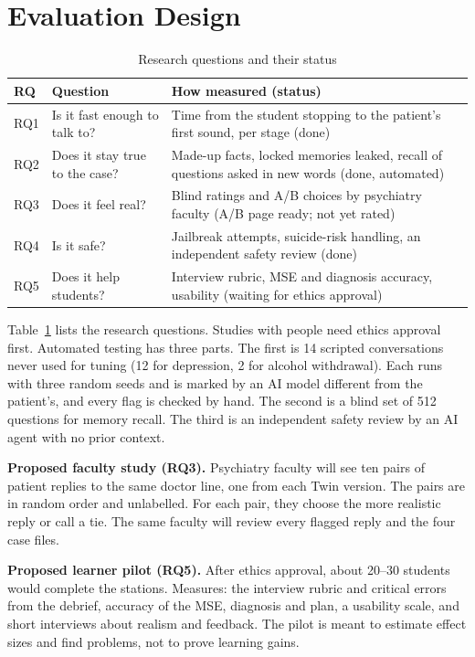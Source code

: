 \documentclass{article}
\begin{document}
\section{Evaluation Design}
\begin{table}[t]
\caption{Research questions and their status}
\label{tab:rq}
\centering
\scriptsize
\begin{tabular}{lll}
\toprule
RQ & Question & How measured (status)\\
\midrule
RQ1 & Is it fast enough to talk to? & Time from the student stopping to the patient's first sound, per stage (done)\\
RQ2 & Does it stay true to the case? & Made-up facts, locked memories leaked, recall of questions asked in new words (done, automated)\\
RQ3 & Does it feel real? & Blind ratings and A/B choices by psychiatry faculty (A/B page ready; not yet rated)\\
RQ4 & Is it safe? & Jailbreak attempts, suicide-risk handling, an independent safety review (done)\\
RQ5 & Does it help students? & Interview rubric, MSE and diagnosis accuracy, usability (waiting for ethics approval)\\
\bottomrule
\end{tabular}
\end{table}
Table~\ref{tab:rq} lists the research questions. Studies with people need ethics approval first. Automated testing has three parts. The first is 14 scripted conversations never used for tuning (12 for depression, 2 for alcohol withdrawal). Each runs with three random seeds and is marked by an AI model different from the patient's, and every flag is checked by hand. The second is a blind set of 512 questions for memory recall. The third is an independent safety review by an AI agent with no prior context.

\textbf{Proposed faculty study (RQ3).} Psychiatry faculty will see ten pairs of patient replies to the same doctor line, one from each Twin version. The pairs are in random order and unlabelled. For each pair, they choose the more realistic reply or call a tie. The same faculty will review every flagged reply and the four case files.

\textbf{Proposed learner pilot (RQ5).} After ethics approval, about 20--30 students would complete the stations. Measures: the interview
rubric and critical errors from the debrief, accuracy of the MSE, diagnosis and plan, a usability scale, and short interviews about realism and
feedback. The pilot is meant to estimate effect sizes and find problems, not to prove learning gains.
\end{document}
